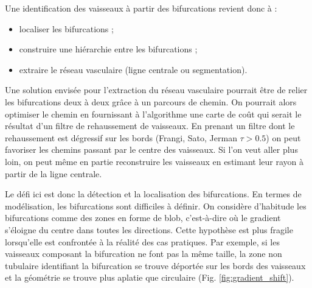 Une identification des vaisseaux à partir des bifurcations revient donc à :

\begin{itemize}
\item localiser les bifurcations ;
\item construire une hiérarchie entre les bifurcations ;
\item extraire le réseau vasculaire (ligne centrale ou segmentation).
\end{itemize}

Une solution envisée pour l'extraction du réseau vasculaire pourrait être de relier les bifurcations deux à deux grâce à un parcours de chemin. On pourrait alors optimiser le chemin en fournissant à l'algorithme une carte de coût qui serait le résultat d'un filtre de rehaussement de vaisseaux. En prenant un filtre dont le rehaussement est dégressif sur les bords (Frangi, Sato, Jerman $\tau > 0.5$) on peut favoriser les chemins passant par le centre des vaisseaux. Si l'on veut aller plus loin, on peut même en partie reconstruire les vaisseaux en estimant leur rayon à partir de la ligne centrale.

Le défi ici est donc la détection et la localisation des bifurcations. En termes de modélisation, les bifurcations sont difficiles à définir. On considère d'habitude les bifurcations comme des zones en forme de blob, c'est-à-dire où le gradient s'éloigne du centre dans toutes les directions. Cette hypothèse est plus fragile lorsqu'elle est confrontée à la réalité des cas pratiques. Par exemple, si les vaisseaux composant la bifurcation ne font pas la même taille, la zone non tubulaire identifiant la bifurcation se trouve déportée sur les bords des vaisseaux et la géométrie se trouve plus aplatie que circulaire (Fig. \ref{fig:gradient_shift}). 

